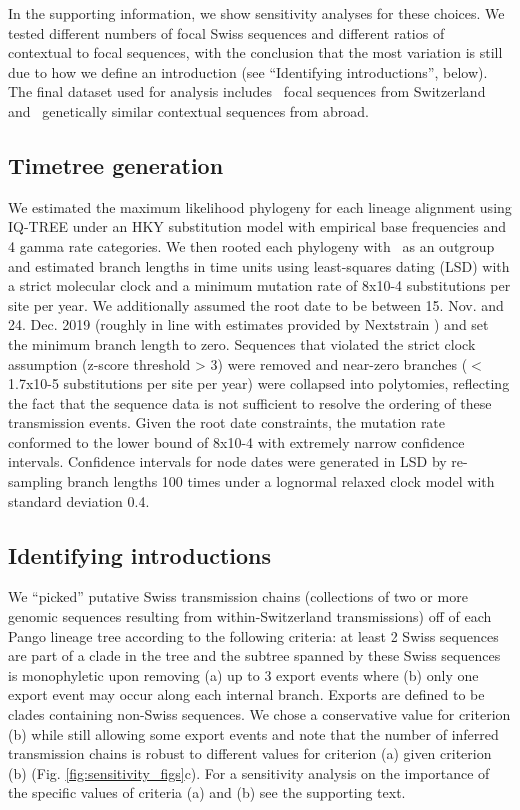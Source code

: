 \documentclass[9pt,twoside,lineno]{pnas-new}
\begin{document}
In the supporting information, we show sensitivity analyses for these choices. We tested different numbers of focal Swiss sequences and different ratios of contextual to focal sequences, with the conclusion that the most variation is still due to how we define an introduction (see ``Identifying introductions'', below). The final dataset used for analysis includes \nfocalsamples\ focal sequences from Switzerland and \nsimcontext\ genetically similar contextual sequences from abroad.

\subsection{Timetree generation}
We estimated the maximum likelihood phylogeny for each lineage alignment using IQ-TREE \cite{Nguyen2014} under an HKY substitution model \cite{Hasegawa1985} with empirical base frequencies and 4 gamma rate categories. We then rooted each phylogeny with \outgroupgisaidepiisls\ as an outgroup and estimated branch lengths in time units using least-squares dating (LSD) \cite{To2016} with a strict molecular clock and a minimum mutation rate of 8x10-4 substitutions per site per year. We additionally assumed the root date to be between 15. Nov. and 24. Dec. 2019 (roughly in line with estimates provided by Nextstrain \cite{Nextstrainteam}) and set the minimum branch length to zero. Sequences that violated the strict clock assumption (z-score threshold > 3) were removed and near-zero branches ($<$1.7x10-5 substitutions per site per year) were collapsed into polytomies, reflecting the fact that the sequence data is not sufficient to resolve the ordering of these transmission events. Given the root date constraints, the mutation rate conformed to the lower bound of 8x10-4 with extremely narrow confidence intervals. Confidence intervals for node dates were generated in LSD by re- sampling branch lengths 100 times under a lognormal relaxed clock model with standard deviation 0.4.

\subsection{Identifying introductions}
We ``picked'' putative Swiss transmission chains (collections of two or more genomic sequences resulting from within-Switzerland transmissions) off of each Pango lineage tree according to the following criteria: at least 2 Swiss sequences are part of a clade in the tree and the subtree spanned by these Swiss sequences is monophyletic upon removing (a) up to 3 export events where (b) only one export event may occur along each internal branch. Exports are defined to be clades containing non-Swiss sequences. We chose a conservative value for criterion (b) while still allowing some export events and note that the number of inferred transmission chains is robust to different values for criterion (a) given criterion (b) (Fig. \ref{fig:sensitivity_figs}c). For a sensitivity analysis on the importance of the specific values of criteria (a) and (b) see the supporting text.
\end{document}
